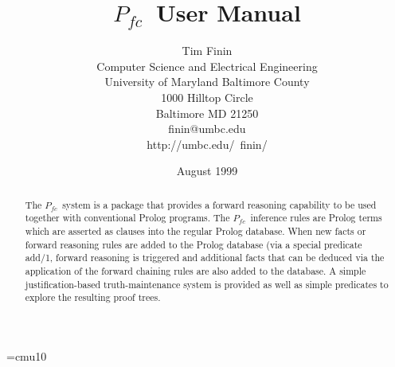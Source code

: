 
\setlength{\parindent}{0in}
\setlength{\parskip}{.2in}


\font\tenu=cmu10 %
\setlength{\textwidth}{6.5 in}
\setlength{\oddsidemargin}{0 in}
\setlength{\evensidemargin}{0 in}
\setlength{\topmargin}{-37 pt}
\setlength{\textheight}{9 in}


\pagestyle{headings}

\newcommand{\pfc}{$P_{fc}$}

\newcommand{\example}
   {\begin{quote}
    \small
    \setlength{\rightmargin}{0in}
    \begin{verbatim}}

\newcommand{\figline}{\centerline{\rule{\linewidth}{1pt}}}


\newenvironment{compactitemize}
    {\begin{itemize} \setlength{\itemsep}{-.05in} }{\end{itemize}}


\newcommand{\gloss}[1] {\subsubsection*{#1}}

\newcommand{\prolog}[1]{{\tt\bf {#1}}}



\title{\pfc\ User Manual}
\author{
  Tim Finin\\
  Computer Science and Electrical Engineering\\
  University of Maryland Baltimore County\\
  1000 Hilltop Circle\\
  Baltimore MD 21250\\
  finin@umbc.edu\\
  http://umbc.edu/~finin/
}

\date{August 1999}
\maketitle

\begin{abstract}

The \pfc\ system is a package that provides a forward reasoning
capability to be used together with conventional Prolog programs.  The
\pfc\ inference rules are Prolog terms which are asserted as clauses
into the regular Prolog database.  When new facts or forward reasoning
rules are added to the Prolog database (via a special predicate add/1,
forward reasoning is triggered and additional facts that can be
deduced via the application of the forward chaining rules are also
added to the database.  A simple justification-based truth-maintenance
system is provided as well as simple predicates to explore the
resulting proof trees.  
\end{abstract}









